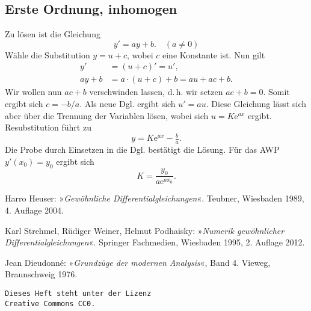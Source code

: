 \documentclass[a4paper,11pt,fleqn,twocolumn,twoside,openany]{scrartcl}
\numberwithin{equation}{section}
\newcommand{\ee}{\mathrm e}
\theoremstyle{defstyle}
\numberwithin{Definition}{section}
\begin{document}
\subsection{Erste Ordnung, inhomogen}
Zu lösen ist die Gleichung
\begin{equation}
y' = ay+b.\quad (a\ne 0)
\end{equation}
Wähle die Substitution $y=u+c$, wobei
$c$ eine Konstante ist. Nun gilt%
\begin{align}
y' &= (u+c)' = u',\\
ay+b &= a\cdot (u+c)+b = au+ac+b.
\end{align}
Wir wollen nun $ac+b$ verschwinden lassen, d.\,h. wir setzen
$ac+b=0$. Somit ergibt sich $c=-b/a$. Als neue Dgl. ergibt sich
$u' = au$. Diese Gleichung lässt sich aber über die Trennung
der Variablen lösen, wobei sich $u=K\ee^{ax}$ ergibt. Resubstitution
führt zu%
\begin{equation}
y = K\ee^{ax}-\tfrac{b}{a}.
\end{equation}
Die Probe durch Einsetzen in die Dgl. bestätigt die Lösung.
Für das AWP $y'(x_0)=y_0$ ergibt sich%
\begin{equation}
K = \frac{y_0}{a\ee^{ax_0}}.
\end{equation}

\begin{thebibliography}{x}
 Harro Heuser: »\emph{Gewöhnliche
Differentialgleichungen}«. Teubner, Wiesbaden 1989, 4. Auflage 2004.

 Karl Strehmel, Rüdiger Weiner, Helmut Podhaisky:
»\emph{Numerik gewöhnlicher Differentialgleichungen}«. Springer
Fachmedien, Wiesbaden 1995, 2. Auflage 2012.

 Jean Dieudonné:
»\emph{Grundzüge der modernen Analysis}«, Band 4.
Vieweg, Braunschweig 1976.
\end{thebibliography}

\vfill
\noindent
\texttt{Dieses Heft steht unter der Lizenz\\
Creative Commons CC0.}
\end{document}
